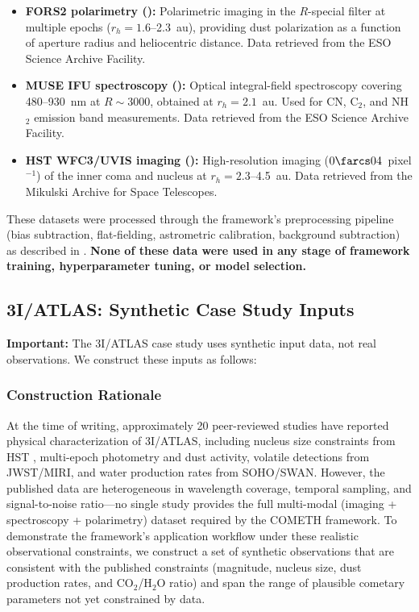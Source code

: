 \documentclass[usenatbib]{mnras}
\begin{document}
\begin{itemize}
    \item \textbf{FORS2 polarimetry (\citealt{bagnulo21}):} Polarimetric imaging in the $R$-special filter at multiple epochs ($r_h = 1.6$--2.3~au), providing dust polarization as a function of aperture radius and heliocentric distance. Data retrieved from the ESO Science Archive Facility.
    \item \textbf{MUSE IFU spectroscopy (\citealt{opitom20}):} Optical integral-field spectroscopy covering 480--930~nm at $R \sim 3000$, obtained at $r_h = 2.1$~au. Used for CN, C$_2$, and NH$_2$ emission band measurements. Data retrieved from the ESO Science Archive Facility.
    \item \textbf{HST WFC3/UVIS imaging (\citealt{jewitt20}):} High-resolution imaging ($0\farcs04$~pixel$^{-1}$) of the inner coma and nucleus at $r_h = 2.3$--4.5~au. Data retrieved from the Mikulski Archive for Space Telescopes.
\end{itemize}

These datasets were processed through the framework's preprocessing pipeline (bias subtraction, flat-fielding, astrometric calibration, background subtraction) as described in \citet{paperI}. \textbf{None of these data were used in any stage of framework training, hyperparameter tuning, or model selection.}

\subsection{3I/ATLAS: Synthetic Case Study Inputs}

\textbf{Important:} The 3I/ATLAS case study uses synthetic input data, not real observations. We construct these inputs as follows:

\subsubsection{Construction Rationale}

At the time of writing, approximately 20 peer-reviewed studies have reported physical characterization of 3I/ATLAS, including nucleus size constraints from HST \citep{jewitt25}, multi-epoch photometry and dust activity, volatile detections from JWST/MIRI, and water production rates from SOHO/SWAN. However, the published data are heterogeneous in wavelength coverage, temporal sampling, and signal-to-noise ratio---no single study provides the full multi-modal (imaging + spectroscopy + polarimetry) dataset required by the COMETH framework. To demonstrate the framework's application workflow under these realistic observational constraints, we construct a set of synthetic observations that are consistent with the published constraints (magnitude, nucleus size, dust production rates, and CO$_2$/H$_2$O ratio) and span the range of plausible cometary parameters not yet constrained by data.
\end{document}
